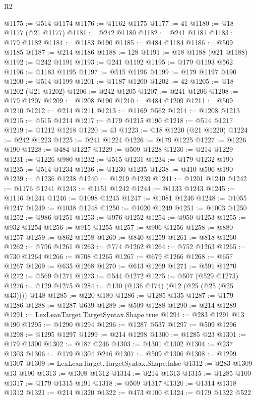 \begin{lexlean}{R2}
\begin{coremodule}
@1175 := @514 @1174
@1176 := @1162 @1175
@1177 := 41
@1180 := @18 @1177 (@21 @1177)
@1181 := @242 @1180
@1182 := @241 @1181
@1183 := @179 @1182
@1184 := @1183 @190
@1185 := @484 @1184
@1186 := @509 @1185
@1187 := @214 @1186
@1188 := 128
@1191 := @18 @1188 (@21 @1188)
@1192 := @242 @1191
@1193 := @241 @1192
@1195 := @179 @1193 @562
@1196 := @1183 @1195
@1197 := @515 @1196
@1199 := @179 @1197 @190
@1200 := @514 @1199
@1201 := @1187 @1200
@1202 := 42
@1205 := @18 @1202 (@21 @1202)
@1206 := @242 @1205
@1207 := @241 @1206
@1208 := @179 @1207
@1209 := @1208 @190
@1210 := @484 @1209
@1211 := @509 @1210
@1212 := @214 @1211
@1213 := @1169 @562
@1214 := @1208 @1213
@1215 := @515 @1214
@1217 := @179 @1215 @190
@1218 := @514 @1217
@1219 := @1212 @1218
@1220 := 43
@1223 := @18 @1220 (@21 @1220)
@1224 := @242 @1223
@1225 := @241 @1224
@1226 := @179 @1225
@1227 := @1226 @190
@1228 := @484 @1227
@1229 := @509 @1228
@1230 := @214 @1229
@1231 := @1226 @980
@1232 := @515 @1231
@1234 := @179 @1232 @190
@1235 := @514 @1234
@1236 := @1230 @1235
@1238 := @410 @506 @190
@1239 := @1236 @1238
@1240 := @1219 @1239
@1241 := @1201 @1240
@1242 := @1176 @1241
@1243 := @1151 @1242
@1244 := @1133 @1243
@1245 := @1116 @1244
@1246 := @1098 @1245
@1247 := @1081 @1246
@1248 := @1055 @1247
@1249 := @1038 @1248
@1250 := @1020 @1249
@1251 := @1003 @1250
@1252 := @986 @1251
@1253 := @976 @1252
@1254 := @950 @1253
@1255 := @932 @1254
@1256 := @915 @1255
@1257 := @906 @1256
@1258 := @880 @1257
@1259 := @862 @1258
@1260 := @840 @1259
@1261 := @818 @1260
@1262 := @796 @1261
@1263 := @774 @1262
@1264 := @752 @1263
@1265 := @730 @1264
@1266 := @708 @1265
@1267 := @679 @1266
@1268 := @657 @1267
@1269 := @635 @1268
@1270 := @613 @1269
@1271 := @591 @1270
@1272 := @569 @1271
@1273 := @544 @1272
@1275 := @507 (@529 @1273)
@1276 := @129 @1275
@1284 := @130 (@136 @174) (@12 (@25 (@25 (@25 @43)))) @148
@1285 := @220 @180
@1286 := @1285 @135
@1287 := @179 @1286
@1288 := @1287 @639
@1289 := @509 @1288
@1290 := @214 @1289
@1291 := LexLeanTarget.TargetSyntax.Shape.true
@1294 := @283 @1291 @13 @190
@1295 := @1290 @1294
@1296 := @1287 @537
@1297 := @509 @1296
@1298 := @1295 @1297
@1299 := @214 @1298
@1300 := @1285 @23
@1301 := @179 @1300
@1302 := @187 @246
@1303 := @1301 @1302
@1304 := @237 @1303
@1306 := @179 @1304 @246
@1307 := @509 @1306
@1308 := @1299 @1307
@1309 := LexLeanTarget.TargetSyntax.Shape.false
@1312 := @283 @1309 @13 @190
@1313 := @1308 @1312
@1314 := @214 @1313
@1315 := @1285 @100
@1317 := @179 @1315 @191
@1318 := @509 @1317
@1320 := @1314 @1318 @1312
@1321 := @214 @1320
@1322 := @473 @100
@1324 := @179 @1322 @522

\end{coremodule}
\end{lexlean}
